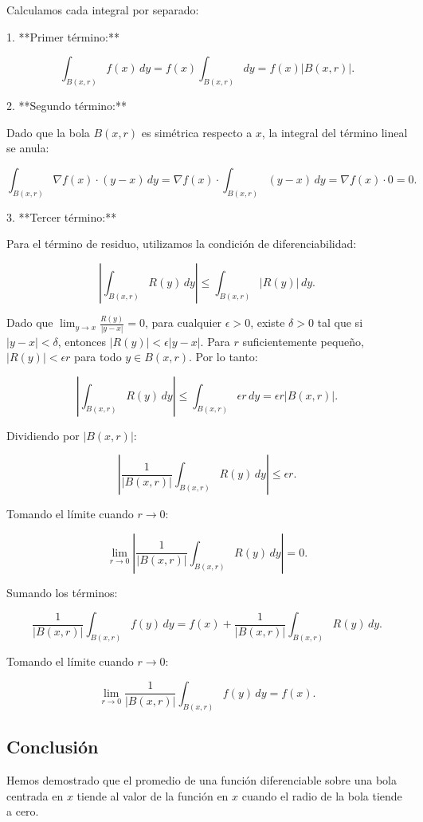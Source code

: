 \documentclass{article}
\begin{document}
Calculamos cada integral por separado:

1. **Primer término:**

\[
\int_{B(x,r)} f(x) \, dy = f(x) \int_{B(x,r)} dy = f(x) |B(x,r)|.
\]

2. **Segundo término:**

Dado que la bola \( B(x,r) \) es simétrica respecto a \( x \), la integral del término lineal se anula:

\[
\int_{B(x,r)} \nabla f(x) \cdot (y - x) \, dy = \nabla f(x) \cdot \int_{B(x,r)} (y - x) \, dy = \nabla f(x) \cdot 0 = 0.
\]

3. **Tercer término:**

Para el término de residuo, utilizamos la condición de diferenciabilidad:

\[
\left| \int_{B(x,r)} R(y) \, dy \right| \leq \int_{B(x,r)} |R(y)| \, dy.
\]

Dado que \( \lim_{y \to x} \frac{R(y)}{|y - x|} = 0 \), para cualquier \( \epsilon > 0 \), existe \( \delta > 0 \) tal que si \( |y - x| < \delta \), entonces \( |R(y)| < \epsilon |y - x| \). Para \( r \) suficientemente pequeño, \( |R(y)| < \epsilon r \) para todo \( y \in B(x,r) \). Por lo tanto:

\[
\left| \int_{B(x,r)} R(y) \, dy \right| \leq \int_{B(x,r)} \epsilon r \, dy = \epsilon r |B(x,r)|.
\]

Dividiendo por \( |B(x,r)| \):

\[
\left| \frac{1}{|B(x,r)|} \int_{B(x,r)} R(y) \, dy \right| \leq \epsilon r.
\]

Tomando el límite cuando \( r \to 0 \):

\[
\lim_{r \to 0} \left| \frac{1}{|B(x,r)|} \int_{B(x,r)} R(y) \, dy \right| = 0.
\]

Sumando los términos:

\[
\frac{1}{|B(x,r)|} \int_{B(x,r)} f(y) \, dy = f(x) + \frac{1}{|B(x,r)|} \int_{B(x,r)} R(y) \, dy.
\]

Tomando el límite cuando \( r \to 0 \):

\[
\lim_{r \to 0} \frac{1}{|B(x,r)|} \int_{B(x,r)} f(y) \, dy = f(x).
\]

\subsection*{Conclusión}

Hemos demostrado que el promedio de una función diferenciable sobre una bola centrada en \( x \) tiende al valor de la función en \( x \) cuando el radio de la bola tiende a cero.
\end{document}
